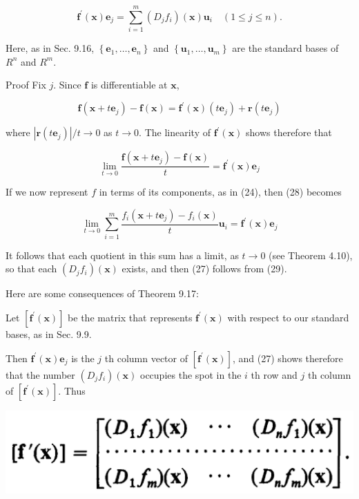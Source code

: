 \documentclass[10pt]{article}
\begin{document}
$$
\mathbf{f}^{\prime}(\mathbf{x}) \mathbf{e}_{j}=\sum_{i=1}^{m}\left(D_{j} f_{i}\right)(\mathbf{x}) \mathbf{u}_{i} \quad(1 \leq j \leq n) .
$$

Here, as in Sec. 9.16, $\left\{\mathbf{e}_{1}, \ldots, \mathbf{e}_{n}\right\}$ and $\left\{\mathbf{u}_{1}, \ldots, \mathbf{u}_{m}\right\}$ are the standard bases of $R^{n}$ and $R^{m}$.

Proof Fix $j$. Since $\mathbf{f}$ is differentiable at $\mathbf{x}$,

$$
\mathbf{f}\left(\mathbf{x}+t \mathbf{e}_{j}\right)-\mathbf{f}(\mathbf{x})=\mathbf{f}^{\prime}(\mathbf{x})\left(t \mathbf{e}_{j}\right)+\mathbf{r}\left(t \mathbf{e}_{j}\right)
$$

where $\left|\mathbf{r}\left(t \mathbf{e}_{j}\right)\right| / t \rightarrow 0$ as $t \rightarrow 0$. The linearity of $\mathbf{f}^{\prime}(\mathbf{x})$ shows therefore that

$$
\lim _{t \rightarrow 0} \frac{\mathbf{f}\left(\mathbf{x}+t \mathbf{e}_{j}\right)-\mathbf{f}(\mathbf{x})}{t}=\mathbf{f}^{\prime}(\mathbf{x}) \mathbf{e}_{j}
$$

If we now represent $f$ in terms of its components, as in (24), then (28) becomes

$$
\lim _{t \rightarrow 0} \sum_{i=1}^{m} \frac{f_{i}\left(\mathbf{x}+t \mathbf{e}_{j}\right)-f_{i}(\mathbf{x})}{t} \mathbf{u}_{i}=\mathbf{f}^{\prime}(\mathbf{x}) \mathbf{e}_{j}
$$

It follows that each quotient in this sum has a limit, as $t \rightarrow 0$ (see Theorem 4.10), so that each $\left(D_{j} f_{i}\right)(\mathbf{x})$ exists, and then (27) follows from (29).

Here are some consequences of Theorem 9.17:

Let $\left[\mathbf{f}^{\prime}(\mathbf{x})\right]$ be the matrix that represents $\mathbf{f}^{\prime}(\mathbf{x})$ with respect to our standard bases, as in Sec. 9.9.

Then $\mathbf{f}^{\prime}(\mathbf{x}) \mathbf{e}_{j}$ is the $j$ th column vector of $\left[\mathbf{f}^{\prime}(\mathbf{x})\right]$, and (27) shows therefore that the number $\left(D_{j} f_{i}\right)(\mathbf{x})$ occupies the spot in the $i$ th row and $j$ th column of $\left[\mathbf{f}^{\prime}(\mathbf{x})\right]$. Thus

\begin{center}
\includegraphics[max width=\textwidth]{2023_08_17_055ccbec3ce53a1b74ebg-226}
\end{center}
\end{document}
